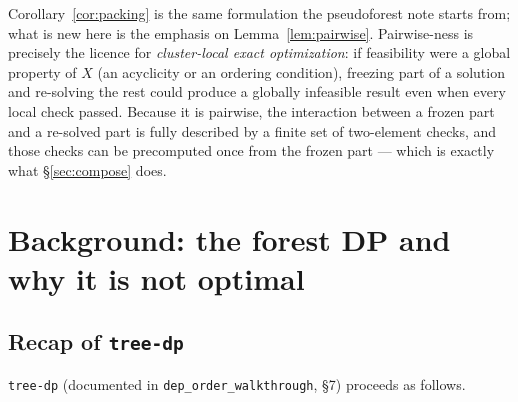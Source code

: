 \documentclass[11pt,a4paper]{article}
\theoremstyle{definition}
\theoremstyle{plain}
\theoremstyle{remark}
\begin{document}
Corollary~\ref{cor:packing} is the same formulation the pseudoforest note
starts from; what is new here is the emphasis on Lemma~\ref{lem:pairwise}.
Pairwise-ness is precisely the licence for \emph{cluster-local exact
optimization}: if feasibility were a global property of $X$ (an
acyclicity or an ordering condition), freezing part of a solution and
re-solving the rest could produce a globally infeasible result even when
every local check passed. Because it is pairwise, the interaction between
a frozen part and a re-solved part is fully described by a finite set of
two-element checks, and those checks can be precomputed once from the
frozen part --- which is exactly what \S\ref{sec:compose} does.

\section{Background: the forest DP and why it is not optimal}
\label{sec:treedp}

\subsection{Recap of \texttt{tree-dp}}

\texttt{tree-dp} (documented in \texttt{dep\_order\_walkthrough}, \S7)
proceeds as follows.
\end{document}
